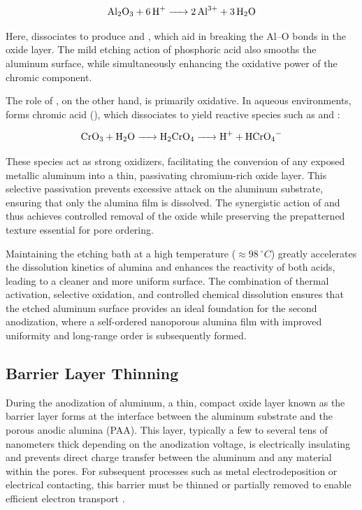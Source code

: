 \documentclass{rapportCS}
\begin{document}
	\begin{equation}
		\ce{Al2O3 + 6H+ -> 2Al^{3+} + 3H2O}
		\label{eq:Al2O3Dissolution}
	\end{equation}
	
	Here,  dissociates to produce  and , which aid in breaking the Al–O bonds in the oxide layer. The mild etching action of phosphoric acid also smooths the aluminum surface, while simultaneously enhancing the oxidative power of the chromic component.
	
	The role of , on the other hand, is primarily oxidative. In aqueous environments,  forms chromic acid (), which dissociates to yield reactive species such as  and :
	
	\begin{equation}
		\ce{CrO3 + H2O -> H2CrO4 -> H+ + HCrO4^-}
		\label{eq:chromicAcidFormation}
	\end{equation}
	
	These species act as strong oxidizers, facilitating the conversion of any exposed metallic aluminum into a thin, passivating chromium-rich oxide layer. This selective passivation prevents excessive attack on the aluminum substrate, ensuring that only the alumina film is dissolved. The synergistic action of  and  thus achieves controlled removal of the oxide while preserving the prepatterned texture essential for pore ordering.
	
	Maintaining the etching bath at a high temperature ($ \approx 98~^{\circ}C$) greatly accelerates the dissolution kinetics of alumina and enhances the reactivity of both acids, leading to a cleaner and more uniform surface. The combination of thermal activation, selective oxidation, and controlled chemical dissolution ensures that the etched aluminum surface provides an ideal foundation for the second anodization, where a self-ordered nanoporous alumina film with improved uniformity and long-range order is subsequently formed.
	
	
	\subsection{Barrier Layer Thinning}
	
	During the anodization of aluminum, a thin, compact oxide layer known as the barrier layer forms at the interface between the aluminum substrate and the porous anodic alumina (PAA). This layer, typically a few to several tens of nanometers thick depending on the anodization voltage, is electrically insulating and prevents direct charge transfer between the aluminum and any material within the pores. For subsequent processes such as metal electrodeposition or electrical contacting, this barrier must be thinned or partially removed to enable efficient electron transport \cite{gu20163d}.
	
\end{document}
